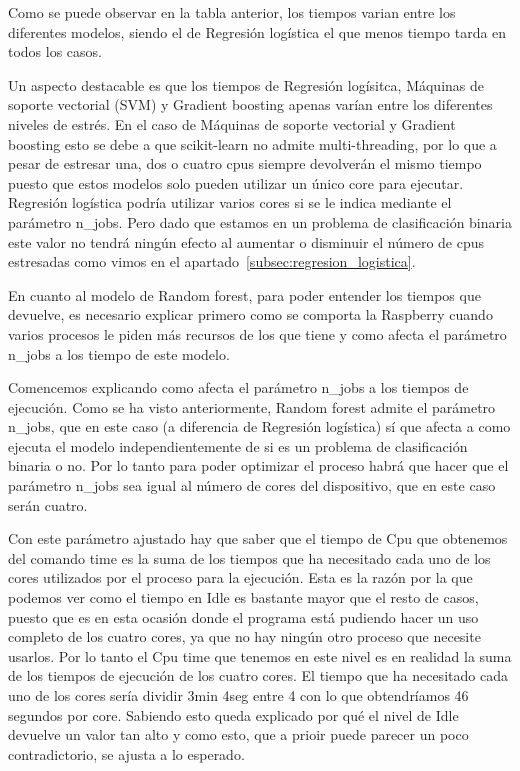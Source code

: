 \documentclass[a4paper, 12pt]{book}
\begin{document}
Como se puede observar en la tabla anterior, los tiempos varian entre los diferentes modelos, siendo el de Regresión logística el que menos tiempo tarda en todos los casos.

Un aspecto destacable es que los tiempos de Regresión logísitca, Máquinas de soporte vectorial (SVM) y Gradient boosting apenas varían entre los diferentes niveles de estrés. En el caso de Máquinas de soporte vectorial y Gradient boosting esto se debe a que scikit-learn no admite multi-threading, por lo que a pesar de estresar una, dos o cuatro cpus siempre devolverán el mismo tiempo puesto que estos modelos solo pueden utilizar un único core para ejecutar.\\
Regresión logística podría utilizar varios cores si se le indica mediante el parámetro n\_jobs. Pero dado que estamos en un problema de clasificación binaria este valor no tendrá ningún efecto al aumentar o disminuir el número de cpus estresadas como vimos en el apartado~\ref{subsec:regresion_logistica}.

En cuanto al modelo de Random forest, para poder entender los tiempos que devuelve, es necesario explicar primero como se comporta la Raspberry cuando varios procesos le piden más recursos de los que tiene y como afecta el parámetro n\_jobs a los tiempo de este modelo.

Comencemos explicando como afecta el parámetro n\_jobs a los tiempos de ejecución. Como se ha visto anteriormente, Random forest admite el parámetro n\_jobs, que en este caso (a diferencia de Regresión logística) sí que afecta a como ejecuta el modelo independientemente de si es un problema de clasificación binaria o no. Por lo tanto para poder optimizar el proceso habrá que hacer que el parámetro n\_jobs sea igual al número de cores del dispositivo, que en este caso serán cuatro. 

Con este parámetro ajustado hay que saber que el tiempo de Cpu que obtenemos del comando time es la suma de los tiempos que ha necesitado cada uno de los cores utilizados por el proceso para la ejecución. Esta es la razón por la que podemos ver como el tiempo en Idle es bastante mayor que el resto de casos, puesto que es en esta ocasión donde el programa está pudiendo hacer un uso completo de los cuatro cores, ya que no hay ningún otro proceso que necesite usarlos. Por lo tanto el Cpu time que tenemos en este nivel es en realidad la suma de los tiempos de ejecución de los cuatro cores. El tiempo que ha necesitado cada uno de los cores sería dividir 3min 4seg entre 4 con lo que obtendríamos 46 segundos por core. Sabiendo esto queda explicado por qué el nivel de Idle devuelve un valor tan alto y como esto, que a prioir puede parecer un poco contradictorio, se ajusta a lo esperado.
\end{document}
